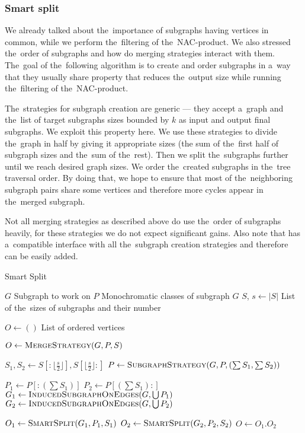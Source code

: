 \subsubsection*{Smart split}%
\label{sec:smart_split}

We already talked about the~importance of subgraphs having vertices in common,
while we perform the~filtering of the~NAC-product.
We also stressed the~order of subgraphs and
how do merging strategies interact with them.
The~goal of the~following algorithm is to create and order subgraphs in a~way that they usually
share property that reduces the~output size while running
the~filtering of the~NAC-product.

The~strategies for subgraph creation are generic --- they accept a~graph and
the~list of target subgraphs sizes bounded by \( k \) as input and output final subgraphs.
We exploit this property here.
We use these strategies to divide the~graph in half by giving it appropriate
sizes (the sum of the~first half of subgraph sizes and the~sum of the~rest).
Then we split the~subgraphs further until we reach desired graph sizes.
We order the~created subgraphs in the~tree traversal order.
By doing that, we hope to ensure that most of the~neighboring subgraph pairs share
some vertices and therefore more cycles appear in the~merged subgraph.

Not all merging strategies as described above do use the~order of subgraphs heavily,
for these strategies we do not expect significant gains.
Also note that  has a~compatible interface with
all the~subgraph creation strategies and therefore can be easily added.

\begin{algorithm}
	\caption{Smart Split}%
	\label{alg:smart_split}
	\begin{algorithmic}[1]
		\Require{} $G$
		\Comment{} Subgraph to work on
		\Require{} $P$
		\Comment{} Monochromatic classes of subgraph $G$
		\Require{} $S$, $s \gets |S|$
		\Comment{} List of the~sizes of subgraphs and their number

		\Ensure{} $O \gets ()$
		\Comment{} List of ordered vertices

		\State{} $O \gets \Call{MergeStrategy}{G, P, S}$
		\State{}
		\Return{}
		\EndIf{}

		\State{} $S_1, S_2 \gets S[:\lfloor\frac{s}{2}\rfloor], S[\lfloor\frac{s}{2}\rfloor:]$
		\State{} $P \gets \Call{SubgraphStrategy}{G, P, (\sum S_{1}, \sum S_{2})}$

		\State{} $P_1 \gets P[:(\sum S_1)]$
		\State{} $P_2 \gets P[(\sum S_1):]$
		\State{} $G_1 \gets \Call{InducedSubgraphOnEdges}{G, \bigcup P_1}$
		\State{} $G_2 \gets \Call{InducedSubgraphOnEdges}{G, \bigcup P_2}$

		\State{} $O_1 \gets \Call{SmartSplit}{G_1, P_1, S_1}$
		\State{} $O_2 \gets \Call{SmartSplit}{G_2, P_2, S_2}$
		\State{} $O \gets O_{1}.O_{2}$
	\end{algorithmic}
\end{algorithm}



